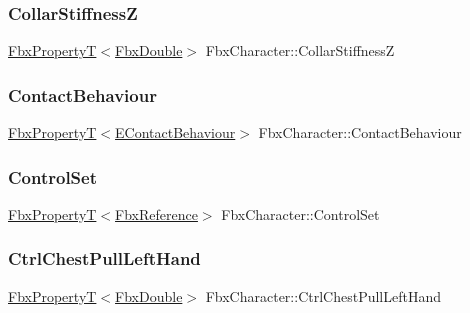 \mbox{\label{class_fbx_character_aed64ee1f0b716afbaba511e81fbcaf8d}} 
\subsubsection{\texorpdfstring{Collar\+StiffnessZ}{CollarStiffnessZ}}
{\footnotesize\ttfamily \hyperlink{class_fbx_property_t}{Fbx\+PropertyT}$<$\hyperlink{fbxtypes_8h_a171e72a1c46fc15c1a6c9c31948c1c5b}{Fbx\+Double}$>$ Fbx\+Character\+::\+Collar\+StiffnessZ}

\mbox{\label{class_fbx_character_a7fa2029676264df553457d41f5e4461b}} 
\subsubsection{\texorpdfstring{Contact\+Behaviour}{ContactBehaviour}}
{\footnotesize\ttfamily \hyperlink{class_fbx_property_t}{Fbx\+PropertyT}$<$\hyperlink{class_fbx_character_a44b6e7961224e21a78dbf91295e480fc}{E\+Contact\+Behaviour}$>$ Fbx\+Character\+::\+Contact\+Behaviour}

\mbox{\label{class_fbx_character_a63ee7beafdba6113be07c3947d83a245}} 
\subsubsection{\texorpdfstring{Control\+Set}{ControlSet}}
{\footnotesize\ttfamily \hyperlink{class_fbx_property_t}{Fbx\+PropertyT}$<$\hyperlink{fbxtypes_8h_a44df6a2eec915cf27cd481e5c5e48a24}{Fbx\+Reference}$>$ Fbx\+Character\+::\+Control\+Set}

\mbox{\label{class_fbx_character_a0b14fa3eedf09891f8b26348c44ba0a2}} 
\subsubsection{\texorpdfstring{Ctrl\+Chest\+Pull\+Left\+Hand}{CtrlChestPullLeftHand}}
{\footnotesize\ttfamily \hyperlink{class_fbx_property_t}{Fbx\+PropertyT}$<$\hyperlink{fbxtypes_8h_a171e72a1c46fc15c1a6c9c31948c1c5b}{Fbx\+Double}$>$ Fbx\+Character\+::\+Ctrl\+Chest\+Pull\+Left\+Hand}

